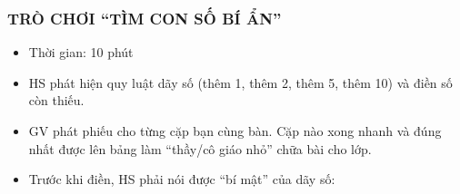 \documentclass[../main.tex]{subfiles}
\begin{document}
\subsubsection{TRÒ CHƠI “TÌM CON SỐ BÍ ẨN”}
\begin{hd}
    \begin{itemize}
        \item Thời gian: 10 phút
        \item HS phát hiện quy luật dãy số (thêm 1, thêm 2, thêm 5, thêm 10) và điền số còn thiếu.
    \end{itemize}
\end{hd}
\begin{itemize}
    \item GV phát phiếu cho từng cặp bạn cùng bàn. Cặp nào xong nhanh và đúng nhất được lên bảng làm “thầy/cô giáo nhỏ” chữa bài cho lớp.
    \item Trước khi điền, HS phải nói được “bí mật” của dãy số: 
\end{itemize}
\begin{center}
    \\[6pt]
    \\[6pt]
    \\[6pt]
\end{center}

\end{document}
